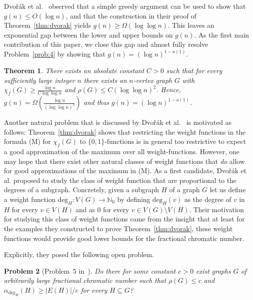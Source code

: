 \documentclass[a4paper,10pt]{amsart}
\newtheorem{theorem}{Theorem}[section]
\newtheorem{problem}[theorem]{Problem}
\begin{document}
Dvo\v{r}\'{a}k et al.~\cite{dvorak} observed that a simple greedy argument can be used to show that $g(n)\le O(\log n)$, and that the construction in their proof of Theorem~\ref{thm:dvorak} yields $g(n)\ge \Omega(\log \log n)$. This leaves an exponential gap between the lower and upper bounds on $g(n)$. As the first main contribution of this paper, we close this gap and almost fully resolve Problem~\ref{prob:4} by showing that $g(n)=(\log n)^{1-o(1)}$. 

\begin{theorem}\label{thm:main}
    There exists an absolute constant $C>0$ such that for every sufficiently large integer $n$ there exists an $n$-vertex graph $G$ with $\chi_f(G)\ge \frac{\log n}{C\log \log n}$ and $\rho(G)\le C(\log\log n)^2$. Hence, $g(n)=\Omega\left(\frac{\log n}{(\log \log n)^3}\right)$ and thus $g(n)=(\log n)^{1-o(1)}$. 
\end{theorem}

Another natural problem that is discussed by Dvo\v{r}\'{a}k et al.~\cite{dvorak} is motivated as follows: Theorem~\ref{thm:dvorak} shows that restricting the weight functions in the formula (M) for $\chi_f(G)$ to $\{0,1\}$-functions is in general too restrictive to expect a good approximation of the maximum over all weight-functions. However, one may hope that there exist other natural classes of weight functions that \emph{do} allow for good approximations of the maximum in (M). As a first candidate, Dvo\v{r}\'{a}k et al. proposed to study the class of weight function that are proportional to the degrees of a subgraph. Concretely, given a subgraph $H$ of a graph $G$ let us define a weight function $\mathrm{deg}_H:V(G)\rightarrow \mathbb{N}_0$ by defining $\mathrm{deg}_H(v)$ as the degree of $v$ in $H$ for every $v\in V(H)$ and as $0$ for every $v\in V(G)\setminus V(H)$. Their motivation for studying this class of weight functions came from the insight that at least for the examples they constructed to prove Theorem~\ref{thm:dvorak}, these weight functions would provide good lower bounds for the fractional chromatic number. 

Explicitly, they posed the following open problem.

\begin{problem}[Problem~5 in~\cite{dvorak}]\label{prob:5}
Do there for some constant $c>0$ exist graphs $G$ of arbitrarily large fractional chromatic number such that $\rho(G)\le c$ and $\alpha_{\mathrm{deg}_H}(H)\ge |E(H)|/c$ for every $H\subseteq G$?
\end{problem}
\end{document}
